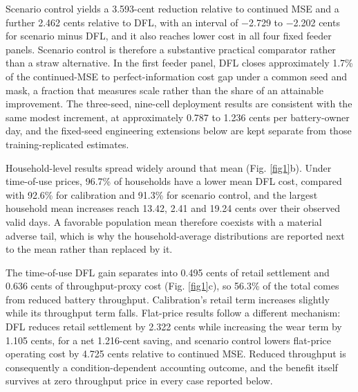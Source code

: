 \documentclass[pdflatex,Numbered,sn-basic]{sn-jnl}
\begin{document}
Scenario control yields a 3.593-cent reduction relative to continued MSE and a further 2.462 cents relative to DFL, with an interval of $-$2.729 to $-$2.202 cents for scenario minus DFL, and it also reaches lower cost in all four fixed feeder panels. Scenario control is therefore a substantive practical comparator rather than a straw alternative. In the first feeder panel, DFL closes approximately 1.7\% of the continued-MSE to perfect-information cost gap under a common seed and mask, a fraction that measures scale rather than the share of an attainable improvement. The three-seed, nine-cell deployment results are consistent with the same modest increment, at approximately 0.787 to 1.236 cents per battery-owner day, and the fixed-seed engineering extensions below are kept separate from those training-replicated estimates.

Household-level results spread widely around that mean (Fig. \ref{fig1}b). Under time-of-use prices, 96.7\% of households have a lower mean DFL cost, compared with 92.6\% for calibration and 91.3\% for scenario control, and the largest household mean increases reach 13.42, 2.41 and 19.24 cents over their observed valid days. A favorable population mean therefore coexists with a material adverse tail, which is why the household-average distributions are reported next to the mean rather than replaced by it.

The time-of-use DFL gain separates into 0.495 cents of retail settlement and 0.636 cents of throughput-proxy cost (Fig. \ref{fig1}c), so 56.3\% of the total comes from reduced battery throughput. Calibration's retail term increases slightly while its throughput term falls. Flat-price results follow a different mechanism: DFL reduces retail settlement by 2.322 cents while increasing the wear term by 1.105 cents, for a net 1.216-cent saving, and scenario control lowers flat-price operating cost by 4.725 cents relative to continued MSE. Reduced throughput is consequently a condition-dependent accounting outcome, and the benefit itself survives at zero throughput price in every case reported below.
\end{document}
